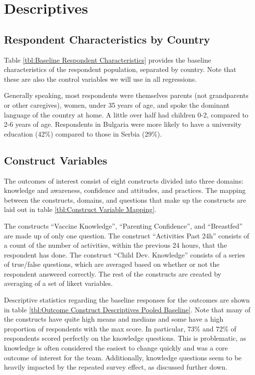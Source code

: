 \documentclass{article}
\begin{document}
\section{Descriptives}


\subsection*{Respondent Characteristics by Country}

Table \ref{tbl:Baseline Respondent Characteristics} provides the baseline characteristics of the respondent population, separated by country. Note that these are also the control variables we will use in all regressions.

Generally speaking, most respondents were themselves parents (not grandparents or other caregives), women, under 35 years of age, and spoke the dominant language of the country at home. A little over half had children 0-2, compared to 2-6 years of age. Respondents in Bulgaria were more likely to have a university education (42\%) compared to those in Serbia (29\%).



\subsection*{Construct Variables}

The outcomes of interest consist of eight constructs divided into three domains: knowledge and awareness, confidence and attitudes, and practices. The mapping between the constructs, domains, and questions that make up the constructs are laid out in table \ref{tbl:Construct Variable Mapping}.

The constructs ``Vaccine Knowledge'', ``Parenting Confidence'', and ``Breastfed'' are made up of only one question. The construct ``Activities Past 24h'' consists of a count of the number of activities, within the previous 24 hours, that the respondent has done. The construct ``Child Dev. Knowledge'' consists of a series of true/false questions, which are averaged based on whether or not the respondent answered correctly. The rest of the constructs are created by averaging of a set of likert variables.

Descriptive statistics regarding the baseline responses for the outcomes are shown in table \ref{tbl:Outcome Construct Descriptives Pooled Baseline}. Note that many of the constructs have quite high means and medians and some have a high proportion of respondents with the max score. In particular, 73\% and 72\% of respondents scored perfectly on the knowledge questions. This is problematic, as knowledge is often considered the easiest to change quickly and was a core outcome of interest for the team. Additionally, knowledge questions seem to be heavily impacted by the repeated survey effect, as discussed further down.
\end{document}
